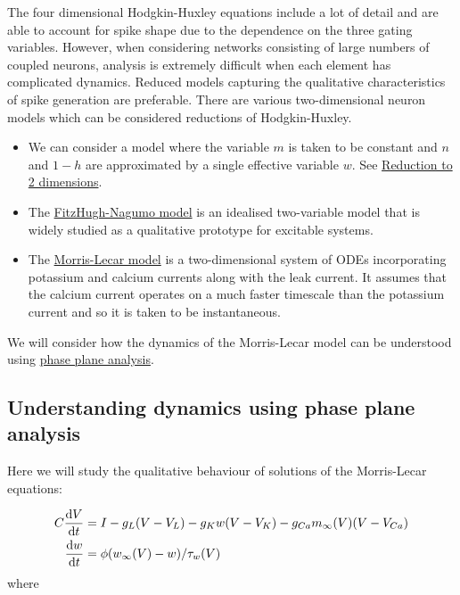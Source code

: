 \documentclass[11pt]{article}
\begin{document}
The four dimensional Hodgkin-Huxley equations include a lot of detail
and are able to account for spike shape due to the dependence on the
three gating variables. However, when considering networks consisting of
large numbers of coupled neurons, analysis is extremely difficult when
each element has complicated dynamics. Reduced models capturing the
qualitative characteristics of spike generation are preferable. There
are various two-dimensional neuron models which can be considered
reductions of Hodgkin-Huxley.

\begin{itemize}
\item
  We can consider a model where the variable \(m\) is taken to be
  constant and \(n\) and \(1-h\) are approximated by a single effective
  variable \(w\). See
  \href{https://neuronaldynamics.epfl.ch/online/Ch4.S2.html}{Reduction
  to 2 dimensions}.
\item
  The
  \href{http://www.scholarpedia.org/article/FitzHugh-Nagumo_model}{FitzHugh-Nagumo
  model} is an idealised two-variable model that is widely studied as a
  qualitative prototype for excitable systems.
\item
  The
  \href{http://www.scholarpedia.org/article/Morris-Lecar_model}{Morris-Lecar
  model} is a two-dimensional system of ODEs incorporating potassium and
  calcium currents along with the leak current. It assumes that the
  calcium current operates on a much faster timescale than the potassium
  current and so it is taken to be instantaneous.
\end{itemize}

We will consider how the dynamics of the Morris-Lecar model can be
understood using
\href{http://www.scholarpedia.org/article/State_space}{phase plane
analysis}.

    \hypertarget{understanding-dynamics-using-phase-plane-analysis}{%
\subsection{Understanding dynamics using phase plane
analysis}\label{understanding-dynamics-using-phase-plane-analysis}}

Here we will study the qualitative behaviour of solutions of the
Morris-Lecar equations:

\begin{align*}
C \frac{{\rm d} V}{{\rm d} t}  &= I - g_{L}(V-V_L) - g_K w (V-V_K) - g_{Ca}m_\infty(V)(V-V_{Ca})\\
 \frac{{\rm d} w}{{\rm d} t} & = \phi (w_\infty(V)-w)/ \tau_w(V)
\end{align*} where
\end{document}
